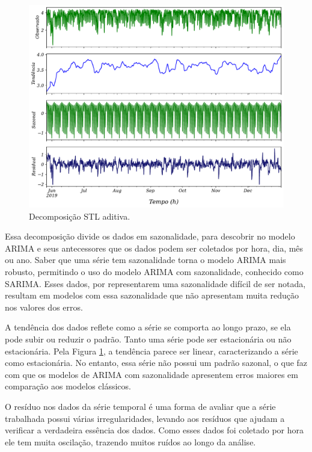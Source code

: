 \begin{figure}[!htb]
	\centering
	\caption{Decomposição STL aditiva.}
	\label{fig:stl}
	\includegraphics[width=\linewidth]{Resultados/Figuras/STL}	
\end{figure}


Essa decomposição divide os dados em sazonalidade, para descobrir no modelo ARIMA e seus antecessores que os dados podem ser coletados por hora, dia, mês ou ano. Saber que uma série tem sazonalidade torna o modelo ARIMA mais robusto, permitindo o uso do modelo ARIMA com sazonalidade, conhecido como SARIMA. Esses dados, por representarem uma sazonalidade difícil de ser notada, resultam em modelos com essa sazonalidade que não apresentam muita redução nos valores dos erros.

A tendência dos dados reflete como a série se comporta ao longo prazo, se ela pode subir ou reduzir o padrão. Tanto uma série pode ser estacionária ou não estacionária. Pela Figura \ref{fig:stl}, a tendência parece ser linear, caracterizando a série como estacionária. No entanto, essa série não possui um padrão sazonal, o que faz com que os modelos de ARIMA com sazonalidade apresentem erros maiores em comparação aos modelos clássicos.

O resíduo nos dados da série temporal é uma forma de avaliar que a série trabalhada possui várias irregularidades, levando aos resíduos que ajudam a verificar a verdadeira essência dos dados. Como esses dados foi coletado por hora ele tem muita oscilação, trazendo muitos ruídos ao longo da análise.


